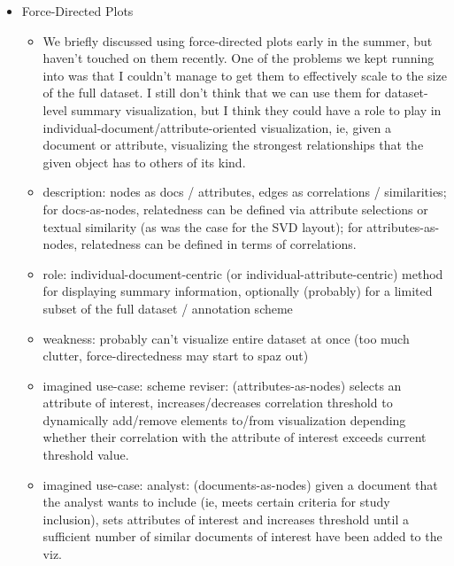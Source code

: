 \documentclass[11pt,letterpaper]{article}
\begin{document}
\begin{itemize}
\item Force-Directed Plots
\begin{itemize}
\item We briefly discussed using force-directed plots early in the summer, but haven't touched on them recently. One of the problems we kept running into was that I couldn't manage to get them to effectively scale to the size of the full dataset. I still don't think that we can use them for dataset-level summary visualization, but I think they could have a role to play in individual-document/attribute-oriented visualization, ie, given a document or attribute, visualizing the strongest relationships that the given object has to others of its kind.
\item description: nodes as docs / attributes, edges as correlations / similarities; for docs-as-nodes, relatedness can be defined via attribute selections or textual similarity (as was the case for the SVD layout); for attributes-as-nodes, relatedness can be defined in terms of correlations.
\item role: individual-document-centric (or individual-attribute-centric) method for displaying summary information, optionally (probably) for a limited subset of the full dataset / annotation scheme
\item weakness: probably can't visualize entire dataset at once (too much clutter, force-directedness may start to spaz out)
\item imagined use-case: scheme reviser: (attributes-as-nodes) selects an attribute of interest, increases/decreases correlation threshold to dynamically add/remove elements to/from visualization depending whether their correlation with the attribute of interest exceeds current threshold value. 
\item imagined use-case: analyst: (documents-as-nodes) given a document that the analyst wants to include (ie, meets certain criteria for study inclusion), sets attributes of interest and increases threshold until a sufficient number of similar documents of interest have been added to the viz.
\end{itemize}


\end{itemize}
\end{document}
